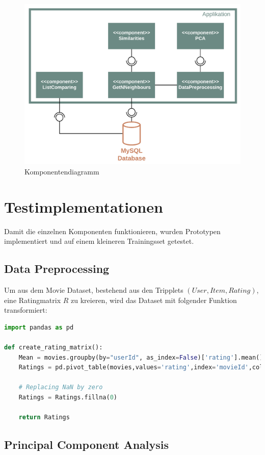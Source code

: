 \begin{figure}[ht]
	\centering
	\includegraphics[keepaspectratio,width=0.66\linewidth]{img/Software Architektur BA.png}
	\caption{Komponentendiagramm}
	\label{fig:Komponentendiagramm}
\end{figure}

\newpage
\section{Testimplementationen}
Damit die einzelnen Komponenten funktionieren, wurden Prototypen implementiert und auf einem kleineren Trainingsset getestet.

\subsection{Data Preprocessing}
Um aus dem Movie Dataset, bestehend aus den Tripplets $(User, Item, Rating)$, eine Ratingmatrix $R$ zu kreieren, wird das Dataset mit folgender Funktion transformiert:

\begin{lstlisting}[language=Python, caption= Create Rating Matrix, label=lst:Create Rating Matrix]
import pandas as pd

def create_rating_matrix():
    Mean = movies.groupby(by="userId", as_index=False)['rating'].mean()
    Ratings = pd.pivot_table(movies,values='rating',index='movieId',columns='userId')
       
    # Replacing NaN by zero
    Ratings = Ratings.fillna(0)

    return Ratings        
\end{lstlisting}

\subsection{Principal Component Analysis}

